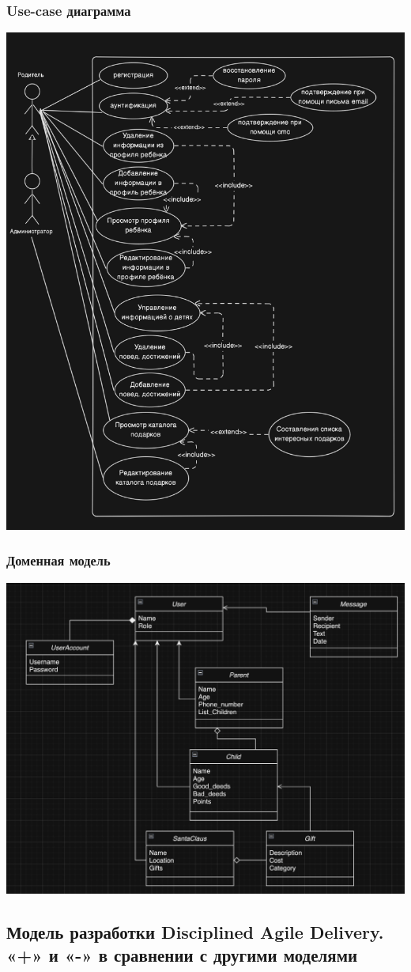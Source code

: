 \documentclass{article}
\begin{document}
\subsubsection{Use-case диаграмма}
\begin{center}
    \includegraphics[width=.7\textwidth]{use-case.png}
\end{center}
\subsubsection{Доменная модель}
\begin{center}
    \includegraphics[width=.7\textwidth]{domain_d.png}
\end{center}

\subsection[Disciplined Agile Delivery, +, -]{Модель разработки Disciplined Agile Delivery. «+» и «-» в сравнении с другими моделями}
\end{document}
